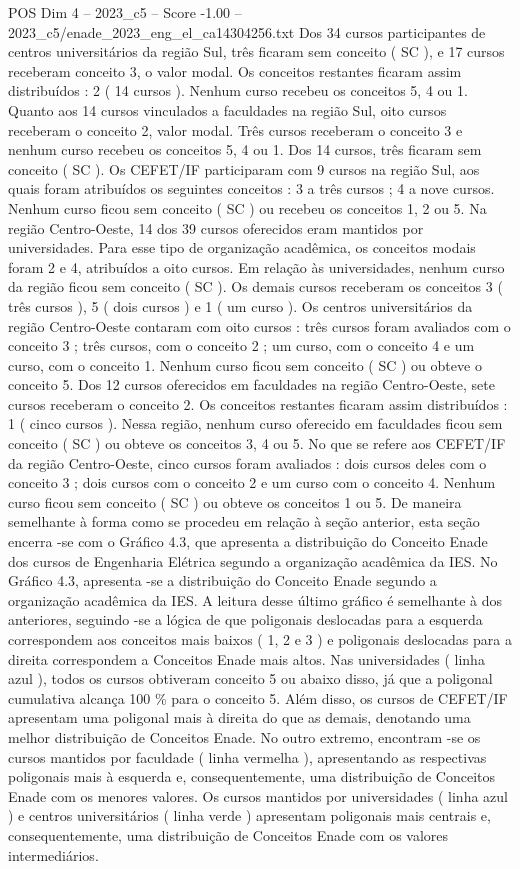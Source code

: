 \begin{textsample}{POS Dim 4 – 2023\_c5 – Score -1.00 – 2023\_c5/enade\_2023\_eng\_el\_ca14304256.txt}
Dos 34 cursos participantes de centros universitários da região Sul, três ficaram sem conceito ( SC ), e 17 cursos receberam conceito 3, o valor modal.
Os conceitos restantes ficaram assim distribuídos : 2 ( 14 cursos ).
Nenhum curso recebeu os conceitos 5, 4 ou 1.
Quanto aos 14 cursos vinculados a faculdades na região Sul, oito cursos receberam o conceito 2, valor modal.
Três cursos receberam o conceito 3 e nenhum curso recebeu os conceitos 5, 4 ou 1.
Dos 14 cursos, três ficaram sem conceito ( SC ).
Os CEFET/IF participaram com 9 cursos na região Sul, aos quais foram atribuídos os seguintes conceitos : 3 a três cursos ; 4 a nove cursos.
Nenhum curso ficou sem conceito ( SC ) ou recebeu os conceitos 1, 2 ou 5.
Na região Centro-Oeste, 14 dos 39 cursos oferecidos eram mantidos por universidades.
Para esse tipo de organização acadêmica, os conceitos modais foram 2 e 4, atribuídos a oito cursos.
Em relação às universidades, nenhum curso da região ficou sem conceito ( SC ).
Os demais cursos receberam os conceitos 3 ( três cursos ), 5 ( dois cursos ) e 1 ( um curso ).
Os centros universitários da região Centro-Oeste contaram com oito cursos : três cursos foram avaliados com o conceito 3 ; três cursos, com o conceito 2 ; um curso, com o conceito 4 e um curso, com o conceito 1.
Nenhum curso ficou sem conceito ( SC ) ou obteve o conceito 5.
Dos 12 cursos oferecidos em faculdades na região Centro-Oeste, sete cursos receberam o conceito 2.
Os conceitos restantes ficaram assim distribuídos : 1 ( cinco cursos ).
Nessa região, nenhum curso oferecido em faculdades ficou sem conceito ( SC ) ou obteve os conceitos 3, 4 ou 5.
No que se refere aos CEFET/IF da região Centro-Oeste, cinco cursos foram avaliados : dois cursos deles com o conceito 3 ; dois cursos com o conceito 2 e um curso com o conceito 4.
Nenhum curso ficou sem conceito ( SC ) ou obteve os conceitos 1 ou 5.
De maneira semelhante à forma como se procedeu em relação à seção anterior, esta seção encerra -se com o Gráfico 4.3, que apresenta a distribuição do Conceito Enade dos cursos de Engenharia Elétrica segundo a organização acadêmica da IES.
No Gráfico 4.3, apresenta -se a distribuição do Conceito Enade segundo a organização acadêmica da IES.
A leitura desse último gráfico é semelhante à dos anteriores, seguindo -se a lógica de que poligonais deslocadas para a esquerda correspondem aos conceitos mais baixos ( 1, 2 e 3 ) e poligonais deslocadas para a direita correspondem a Conceitos Enade mais altos.
Nas universidades ( linha azul ), todos os cursos obtiveram conceito 5 ou abaixo disso, já que a poligonal cumulativa alcança 100 \% para o conceito 5.
Além disso, os cursos de CEFET/IF apresentam uma poligonal mais à direita do que as demais, denotando uma melhor distribuição de Conceitos Enade.
No outro extremo, encontram -se os cursos mantidos por faculdade ( linha vermelha ), apresentando as respectivas poligonais mais à esquerda e, consequentemente, uma distribuição de Conceitos Enade com os menores valores.
Os cursos mantidos por universidades ( linha azul ) e centros universitários ( linha verde ) apresentam poligonais mais centrais e, consequentemente, uma distribuição de Conceitos Enade com os valores intermediários.

\end{textsample}
